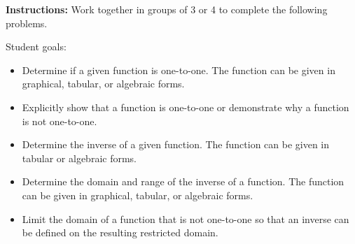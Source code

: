 

\noindent \textbf{Instructions:}  Work together in groups of  3 or 4 to complete the following problems.

Student goals:
\begin{itemize}
\item Determine if a given function is one-to-one. The function can
  be given in graphical, tabular, or algebraic forms.
\item Explicitly show that a function is one-to-one or demonstrate why
  a function is not one-to-one.
\item Determine the inverse of a given function. The function can be
  given in tabular or algebraic forms.
\item Determine the domain and range of the inverse of a function. The
  function can be given in graphical, tabular, or algebraic forms.
\item Limit the domain of a function that is not one-to-one so that an
  inverse can be defined on the resulting restricted domain.
\end{itemize}


